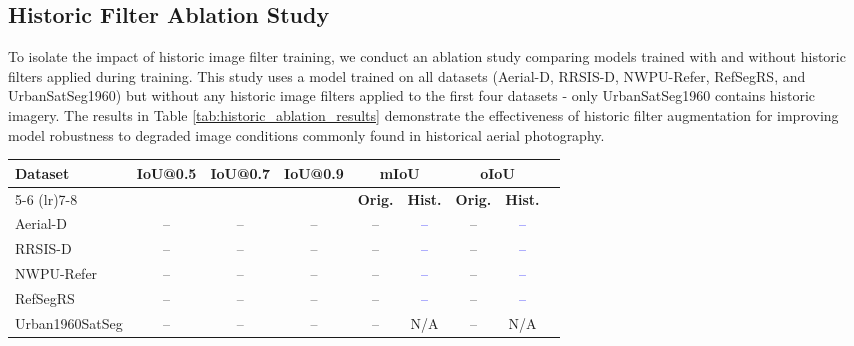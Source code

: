 \subsection{Historic Filter Ablation Study}
\label{subsec:historic_ablation}

To isolate the impact of historic image filter training, we conduct an ablation study comparing models trained with and without historic filters applied during training. This study uses a model trained on all datasets (Aerial-D, RRSIS-D, NWPU-Refer, RefSegRS, and UrbanSatSeg1960) but without any historic image filters applied to the first four datasets - only UrbanSatSeg1960 contains historic imagery. The results in Table \ref{tab:historic_ablation_results} demonstrate the effectiveness of historic filter augmentation for improving model robustness to degraded image conditions commonly found in historical aerial photography.

\begin{table*}[t]
\centering
\caption{Historic Filter Ablation Study - Model Trained on All Datasets Without Historic Filters (except UrbanSatSeg1960)}
\label{tab:historic_ablation_results}
\begin{tabular}{@{}lcccccccc@{}}
\toprule
\textbf{Dataset} & \textbf{IoU@0.5} & \textbf{IoU@0.7} & \textbf{IoU@0.9} & \multicolumn{2}{c}{\textbf{mIoU}} & \multicolumn{2}{c}{\textbf{oIoU}} \\
\cmidrule(lr){5-6} \cmidrule(lr){7-8}
 & & & & \textbf{Orig.} & \textbf{Hist.} & \textbf{Orig.} & \textbf{Hist.} \\
\midrule
Aerial-D & -- & -- & -- & -- & \textcolor{blue}{--} & -- & \textcolor{blue}{--} \\
RRSIS-D & -- & -- & -- & -- & \textcolor{blue}{--} & -- & \textcolor{blue}{--} \\
NWPU-Refer & -- & -- & -- & -- & \textcolor{blue}{--} & -- & \textcolor{blue}{--} \\
RefSegRS & -- & -- & -- & -- & \textcolor{blue}{--} & -- & \textcolor{blue}{--} \\
Urban1960SatSeg & -- & -- & -- & -- & N/A & -- & N/A \\
\bottomrule
\end{tabular}
\end{table*}

